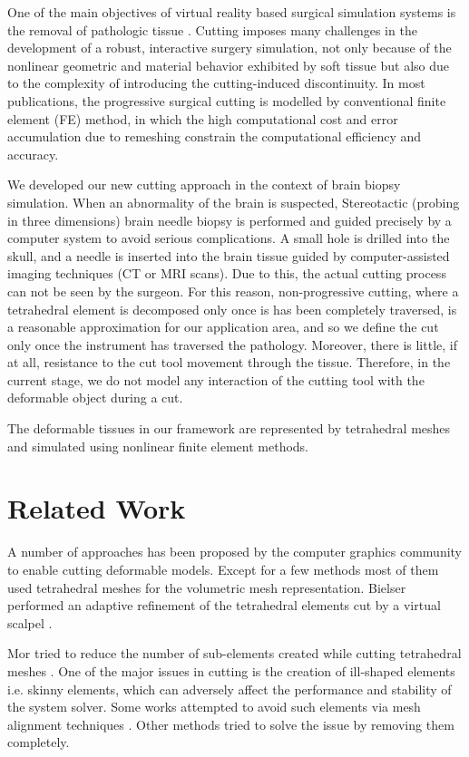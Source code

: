 \label{chapter:Cutting}
One of the main objectives of virtual reality based surgical simulation systems is the removal of pathologic tissue 
\cite{Steinemann, Nienhuys2001a}. Cutting imposes many challenges in the development of a robust, interactive surgery 
simulation, not only because of the nonlinear geometric and material behavior exhibited by soft tissue but also due to the
complexity of introducing the cutting-induced discontinuity. In most publications, the progressive surgical cutting is modelled
by conventional finite element (FE) method, in which the high computational cost and error accumulation due to remeshing constrain 
the computational efficiency and accuracy. 

We developed our new cutting approach in the context of brain biopsy simulation. When an abnormality of the brain is suspected, 
Stereotactic (probing in three dimensions) brain needle biopsy is performed and guided precisely by a computer system to avoid 
serious complications. A small hole is drilled into the skull, and a needle is inserted into the brain tissue guided by computer-assisted 
imaging techniques (CT or MRI scans). Due to this, the actual cutting process can not be seen by the surgeon. For this reason,
non-progressive cutting, where a tetrahedral element is decomposed only once is has been completely traversed, is a reasonable
approximation for our application area, and so we define the cut only once the instrument has traversed the pathology. 
Moreover, there is little, if at all, resistance to the cut tool movement through the tissue. Therefore, in the current stage, we do 
not model any interaction of the cutting tool with the deformable object during a cut. 

The deformable tissues in our framework are represented by tetrahedral meshes and simulated using nonlinear finite element methods. 

\section{Related Work}
A number of approaches has been proposed by the computer graphics community to enable cutting deformable models. 
Except for a few methods most of them used tetrahedral meshes for the volumetric mesh representation. 
Bielser \etal performed an adaptive refinement of the tetrahedral elements cut by a virtual scalpel \cite{Bielser1999}.

Mor \etal tried to reduce the number of sub-elements created while cutting tetrahedral meshes \cite{Mor2000}.
One of the major issues in cutting is the creation of ill-shaped elements i.e. skinny elements, which can adversely affect the
performance and stability of the system solver. Some works attempted to avoid such elements via mesh alignment techniques 
\cite{Nienhuys2001a, Steinemann2006}. Other methods tried to solve the issue by removing them completely.

